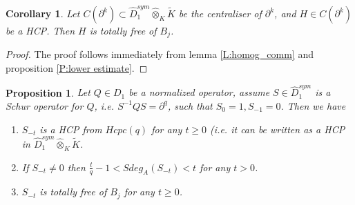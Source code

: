 \documentclass[11pt]{article}
\theoremstyle{definition}
\theoremstyle{plain}
\newtheorem{Prop}{Proposition}[section]
\newtheorem{cor}{Corollary}[section]
\numberwithin{equation}{section}
\begin{document}
\begin{cor}
\label{C:centraliser_free_of_B_j}
Let $C(\partial^k)\subset \hat{D}_1^{sym}\hat{\otimes}_K\tilde{K}$ be the centraliser of $\partial^k$, and $H\in C(\partial^k)$ be a HCP. Then $H$ is totally free of $B_j$.
\end{cor} 

\begin{proof}
The proof follows immediately from lemma \ref{L:homog_comm} and proposition \ref{P:lower estimate}.
\end{proof}


\begin{Prop}
	\label{P:Si}
	Let $Q\in D_1$ be a normalized operator, assume $S\in \hat{D}_{1}^{sym}$ is a Schur operator for $Q$, i.e.  $S^{-1}QS=\partial^q$, such that   $S_{0}=1,S_{-1}=0$. Then we have 
	\begin{enumerate}
		\item $S_{-t}$ is a HCP from $Hcpc(q)$ for any $t\ge 0$ (i.e. it can be written as a HCP in $\hat{D}_1^{sym}\hat{\otimes}_K\tilde{K}$.
		\item If $S_{-t}\neq 0$ then $\frac{t}{q}-1< Sdeg_A(S_{-t})<t$ for any $t> 0$.
		\item $S_{-t}$ is totally free of $B_j$ for any $t\ge 0$.
		\end{enumerate}
\end{Prop} 
\end{document}
